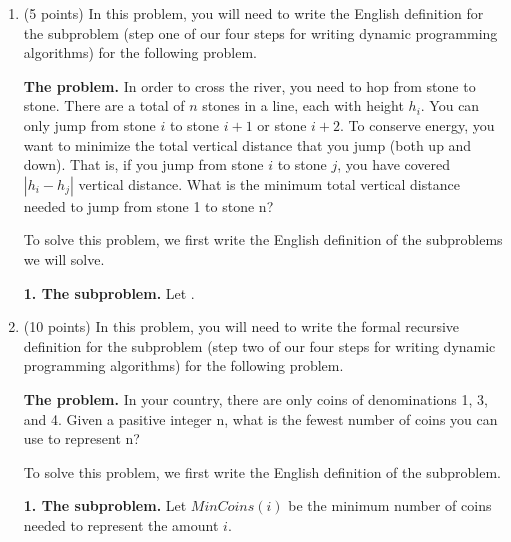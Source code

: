 \documentclass[11pt]{article}
\begin{document}
\begin{enumerate}
\begin{equation*}
\begin{cases}
    \end{cases}
\end{equation*}

The first node is provided for you.

\begin{center}
\end{center}

\newpage

    \item (5 points)
    In this problem, you will need to write the English definition
    for the subproblem (step one of our four steps for writing dynamic programming algorithms)
    for the following problem.
    
    \textbf{The problem.} In order to cross the river, you need to hop from stone to stone.
    There are a total of $n$ stones in a line, each with height $h_i$. You can only jump
    from stone $i$ to stone $i+1$ or stone $i+2$.
    To conserve energy, you want to minimize the total vertical distance that
    you jump (both up and down). That is, if you jump from stone $i$ to stone $j$,
    you have covered $|h_i - h_j|$ vertical distance. What is the minimum total
    vertical distance needed to jump from stone 1 to stone n?

    To solve this problem, we first write the English definition of the subproblems we will solve.

    \textbf{1. The subproblem.} Let \underline{\hspace{10cm}}
    \underline{\hspace{14cm}}.



    \item (10 points)
    In this problem, you will need to write the formal recursive definition
    for the subproblem (step two of our four steps for writing dynamic programming algorithms)
    for the following problem.
    
    \textbf{The problem.} In your country, there are only coins of denominations
    1, 3, and 4. Given a pasitive integer n, what is the fewest number of
    coins you can use to represent n?

    To solve this problem, we first write the English definition of the subproblem.

    \textbf{1. The subproblem.} Let $MinCoins(i)$ be the minimum number of coins needed to represent the amount $i$.


\end{enumerate}
\end{document}
